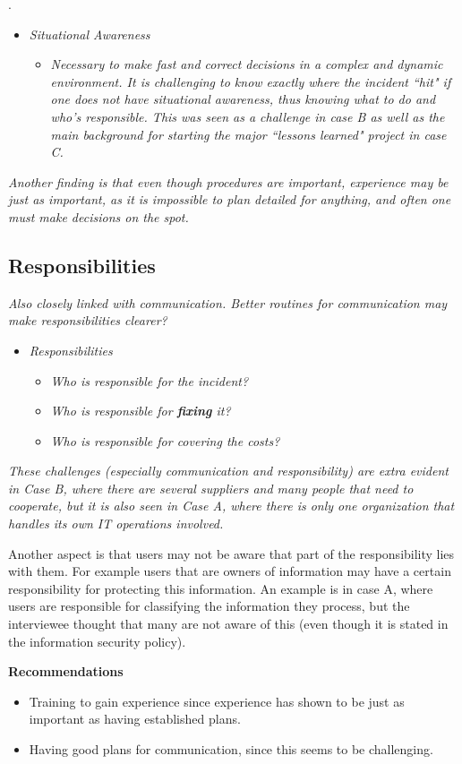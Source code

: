 .

\begin{itemize}
\item \textit{Situational Awareness}
\begin{itemize}
\item\textit{ Necessary to make fast and correct decisions in a complex and dynamic environment. It is challenging to know exactly where the incident ``hit" if one does not have situational awareness, thus knowing what to do and who's responsible. This was  seen as a challenge in case B as well as the main background for starting the major ``lessons learned" project in case C.}
\end{itemize}
\end{itemize}

\textit{Another finding is that even though procedures are important, experience may be just as important, as it is impossible to plan detailed for anything, and often one must make decisions on the spot.}

\subsection{Responsibilities}
\textit{Also closely linked with communication. Better routines for communication may make responsibilities clearer?}

\begin{itemize}
\item \textit{Responsibilities}
\begin{itemize}
\item \textit{Who is responsible for the incident?}
\item \textit{Who is responsible for \textbf{fixing} it?}
\item \textit{Who is responsible for covering the costs?}
\end{itemize}
\end{itemize}

\textit{These challenges (especially communication and responsibility) are extra evident in Case B, where there are several suppliers and many people that need to cooperate, but it is also seen in Case A, where there is only one organization that handles its own IT operations involved.}

Another aspect is that users may not be aware that part of the responsibility lies with them. For example users that are owners of information may have a certain responsibility for protecting this information. An example is in case A, where users are responsible for classifying the information they process, but the interviewee thought that many are not aware of this (even though it is stated in the information security policy).

\textbf{Recommendations}
\begin{itemize}
\item Training to gain experience since experience has shown to be just as important as having established plans.
\item Having good plans for communication, since this seems to be challenging.
\end{itemize}

